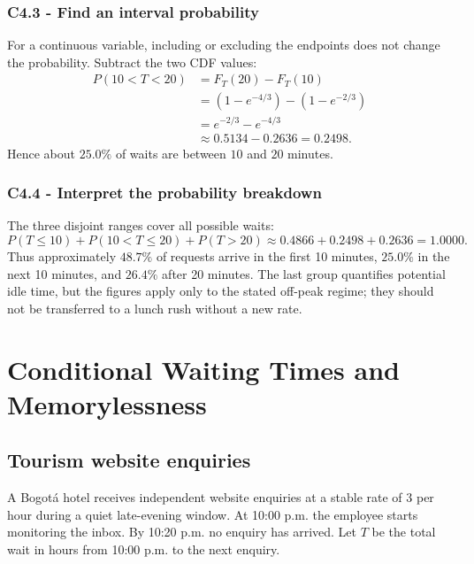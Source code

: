 \subsubsection*{C4.3 - Find an interval probability}\label{subsec:c4-prob-dispatch-c}
For a continuous variable, including or excluding the endpoints does not
change the probability.  Subtract the two CDF values:
\[
\begin{aligned}
 P(10<T<20)
 &=F_T(20)-F_T(10)\\
 &=\left(1-e^{-4/3}\right)-\left(1-e^{-2/3}\right)\\
 &=e^{-2/3}-e^{-4/3}\\
 &\approx0.5134-0.2636=0.2498.
\end{aligned}
\]
Hence about $25.0\%$ of waits are between $10$ and $20$ minutes.

\subsubsection*{C4.4 - Interpret the probability breakdown}\label{subsec:c4-prob-dispatch-d}
The three disjoint ranges cover all possible waits:
\[
 P(T\leq10)+P(10<T\leq20)+P(T>20)
 \approx0.4866+0.2498+0.2636=1.0000.
\]
Thus approximately $48.7\%$ of requests arrive in the first 10 minutes,
$25.0\%$ in the next 10 minutes, and $26.4\%$ after 20 minutes.  The last
group quantifies potential idle time, but the figures apply only to the stated
off-peak regime; they should not be transferred to a lunch rush without a new
rate.

\section{Conditional Waiting Times and Memorylessness}\label{sec:c4-memory}

\subsection{Tourism website enquiries}\label{sec:c4-memory-tourism}
A Bogotá hotel receives independent website enquiries at a stable rate of
$3$ per hour during a quiet late-evening window.  At 10:00 p.m. the employee
starts monitoring the inbox.  By 10:20 p.m. no enquiry has arrived.  Let $T$
be the total wait in hours from 10:00 p.m. to the next enquiry.

